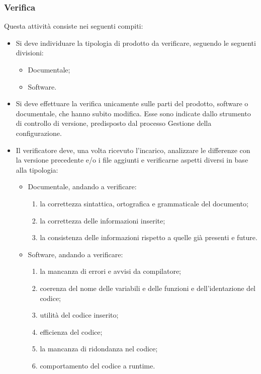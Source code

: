 \subsubsection{Verifica}
Questa attività consiste nei seguenti compiti:
\begin{itemize}
    \item Si deve individuare la tipologia di prodotto da verificare, seguendo le seguenti divisioni:
    \begin{itemize}
        \item Documentale;
        \item Software.
    \end{itemize}
    \item Si deve effettuare la verifica unicamente sulle parti del prodotto, software o documentale, che hanno subito modifica.  Esse sono indicate dallo strumento di controllo di versione,  predisposto dal processo Gestione della configurazione.
    \item Il verificatore deve, una volta ricevuto l'incarico, analizzare le differenze con la versione precedente e/o i file aggiunti e verificarne aspetti diversi in base alla tipologia:
    \begin{itemize}
        \item Documentale, andando a verificare:
        \begin{enumerate}
            \item la correttezza sintattica, ortografica e grammaticale del documento;
            \item la correttezza delle informazioni inserite;
            \item la consistenza delle informazioni rispetto a quelle già presenti e future.
        \end{enumerate}
        \item Software, andando a verificare:
        \begin{enumerate}
            \item la mancanza di errori e avvisi da compilatore;
            \item coerenza del nome delle variabili e delle funzioni e dell'identazione del codice;
            \item utilità del codice inserito;
            \item efficienza del codice;
            \item la mancanza di ridondanza nel codice;
            \item comportamento del codice a runtime. 
        \end{enumerate}

\end{itemize}
\end{itemize}
